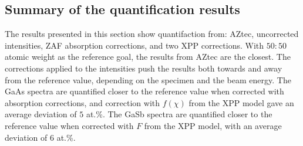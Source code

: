 

















\subsection{Summary of the quantification results}
\label{results:quantification_summary}

The results presented in this section show quantifaction from: AZtec, uncorrected intensities, ZAF absorption corrections, and two XPP corrections.
With $50:50$ atomic weight as the reference goal, the results from AZtec are the closest.
The corrections applied to the intensities push the results both towards and away from the reference value, depending on the specimen and the beam energy.
The GaAs spectra are quantified closer to the reference value when corrected with absorption corrections, and correction with $f(\chi)$ from the XPP model gave an average deviation of $5$ at.\%.
The GaSb spectra are quantified closer to the reference value when corrected with $F$ from the XPP model, with an average deviation of $6$ at.\%.